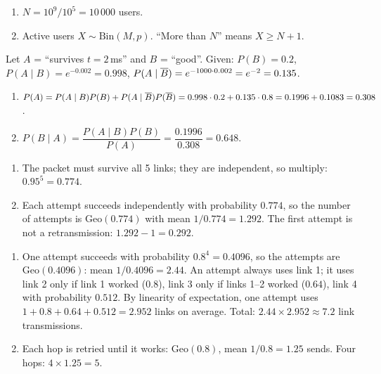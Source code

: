 \begin{enumerate}
  \item[(a)] $N=10^9/10^5=10\,000$ users.
  \item[(b)] Active users $X\sim\text{Bin}(M,p)$. ``More than $N$'' means $X\ge N+1$.
\end{enumerate}

Let $A$ = ``survives $t=2$\,ms'' and $B$ = ``good''. Given: $P(B)=0.2$, $P(A\mid B)=e^{-0.002}=0.998$, $P(A\mid\overline{B})=e^{-1000\cdot0.002}=e^{-2}=0.135$.
\begin{enumerate}
  \item[(a)] $P(A)=P(A\mid B)P(B)+P(A\mid\overline{B})P(\overline{B})=0.998\cdot0.2+0.135\cdot0.8=0.1996+0.1083=0.308$.
  \item[(b)] $P(B\mid A)=\dfrac{P(A\mid B)P(B)}{P(A)}=\dfrac{0.1996}{0.308}=0.648$.
\end{enumerate}

\begin{enumerate}
  \item[(a)] The packet must survive all 5 links; they are independent, so multiply: $0.95^5=0.774$.
  \item[(b)] Each attempt succeeds independently with probability $0.774$, so the number of attempts is $\text{Geo}(0.774)$ with mean $1/0.774=1.292$. The first attempt is not a retransmission: $1.292-1=0.292$.
\end{enumerate}

\begin{enumerate}
  \item[(a)] One attempt succeeds with probability $0.8^4=0.4096$, so the attempts are $\text{Geo}(0.4096)$: mean $1/0.4096=2.44$.
  An attempt always uses link 1; it uses link 2 only if link 1 worked ($0.8$), link 3 only if links 1--2 worked ($0.64$), link 4 with probability $0.512$.
  By linearity of expectation, one attempt uses $1+0.8+0.64+0.512=2.952$ links on average. Total: $2.44\times2.952\approx7.2$ link transmissions.
  \item[(b)] Each hop is retried until it works: $\text{Geo}(0.8)$, mean $1/0.8=1.25$ sends. Four hops: $4\times1.25=5$.
\end{enumerate}

